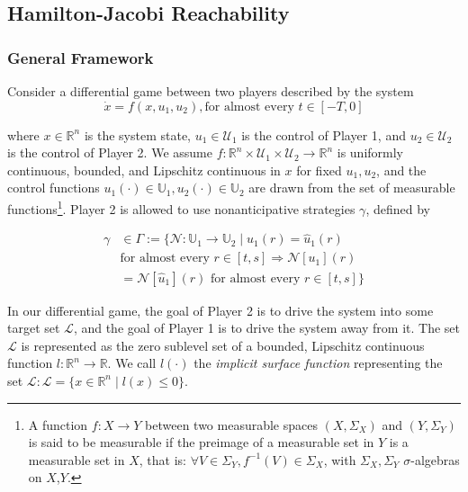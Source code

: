 \subsection{Hamilton-Jacobi Reachability}
\subsubsection{General Framework}
Consider a differential game between two players described by the system
\begin{equation} \label{eq:dyn}
\dot{x} = f(x, u_1, u_2), \text{for almost every }t\in [-T,0]
\end{equation}

\noindent where $x\in\mathbb{R}^n$ is the system state, $u_1\in \mathcal{U}_1$ is the control of Player 1, and $u_2\in\mathcal{U}_2$ is the control of Player 2. We assume $f:\mathbb{R}^n\times \mathcal{U}_1 \times \mathcal{U}_2 \rightarrow \mathbb{R}^n$ is uniformly continuous, bounded, and Lipschitz continuous in $x$ for fixed $u_1,u_2$, and the control functions $u_1(\cdot)\in\mathbb{U}_1,u_2(\cdot)\in\mathbb{U}_2$ are drawn from the set of measurable functions\footnote{
A function $f:X\to Y$ between two measurable spaces $(X,\Sigma_X)$ and $(Y,\Sigma_Y)$ is said to be measurable if the preimage of a measurable set in $Y$ is a measurable set in $X$, that is: $\forall V\in\Sigma_Y, f^{-1}(V)\in\Sigma_X$, with $\Sigma_X,\Sigma_Y$ $\sigma$-algebras on $X$,$Y$.}. Player 2 is allowed to use nonanticipative strategies \cite{Evans84,Varaiya67} $\gamma$, defined by

\begin{equation}
\begin{aligned}
\gamma &\in \Gamma := \{\mathcal{N}: \mathbb{U}_1 \rightarrow \mathbb{U}_2 \mid  u_1(r) = \hat{u}_1(r) \\
&\text{for almost every } r\in[t,s] \Rightarrow \mathcal{N}[u_1](r) \\
&= \mathcal{N}[\hat{u}_1](r) \text{ for almost every } r\in[t,s]\}
\end{aligned}
\end{equation}

In our differential game, the goal of Player 2 is to drive the system into some target set $\mathcal{L}$, and the goal of Player 1 is to drive the system away from it. The set $\mathcal{L}$ is represented as the zero sublevel set of a bounded, Lipschitz continuous function $l:\mathbb{R}^n\rightarrow\mathbb{R}$. We call $l(\cdot)$ the \textit{implicit surface function} representing the set $\mathcal L: \mathcal{L}=\{x\in\mathbb{R}^n \mid l(x)\le 0\}$.

